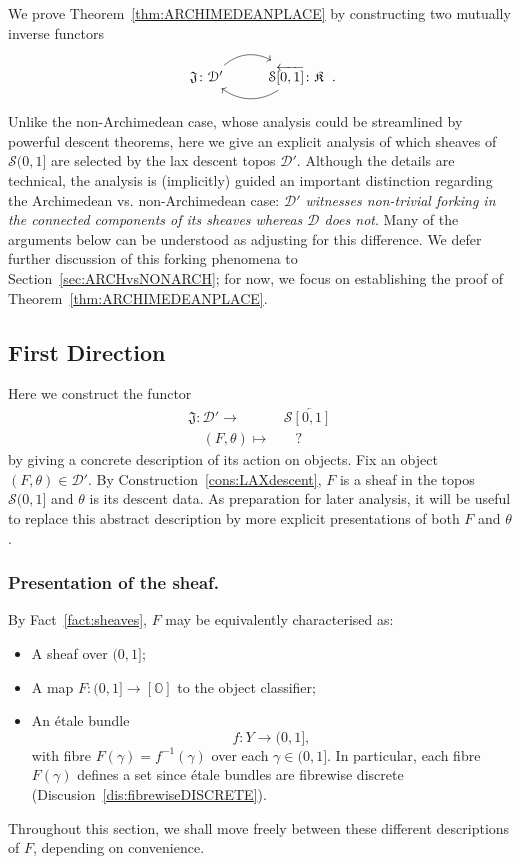 \documentclass[a4paper, 11pt,reqno]{amsart}
\newcommand{\baseS}{\mathcal{S}}
\newcommand{\D}{\mathcal{D}}
\newcommand{\J}{\mathfrak{J}}
\newcommand{\K}{\mathfrak{K}}
\begin{document}
We prove Theorem~\ref{thm:ARCHIMEDEANPLACE} by constructing two mutually inverse functors
\begin{equation*}\label{eq:LAXinverseFUNCTORS}
\begin{tikzcd}
\J\colon\D'
\arrow[r, bend left=35] &
\baseS\overleftarrow{\text{$[0,1]$}}\colon\K
\arrow[l, bend left=35]
\end{tikzcd}\,.
\end{equation*}
Unlike the non-Archimedean case, whose analysis could be streamlined by powerful descent theorems, here we give an explicit analysis of which sheaves of $\baseS(0,1]$ are selected by the lax descent topos $\D'$. Although the details are technical, the analysis is (implicitly) guided an important distinction regarding the Archimedean vs. non-Archimedean case: \emph{$\D'$ witnesses non-trivial forking in the connected components of its sheaves whereas $\D$ does not}. Many of the arguments below can be understood as adjusting for this difference. We defer further discussion of this forking phenomena to Section~\ref{sec:ARCHvsNONARCH}; for now, we focus on establishing the proof of Theorem~\ref{thm:ARCHIMEDEANPLACE}.



\subsection{First Direction}\label{subsec:ElephantstDIRECTION} Here we construct the functor
\begin{align}
\J\colon \D' \longrightarrow & \, \baseS\overleftarrow{[0,1]}\\
\quad (F,\theta)  \mapsto & \quad  ? \qquad\nonumber 
\end{align}
by giving a concrete description of its action on objects. Fix an object $(F,\theta)\in\D'$. By Construction~\ref{cons:LAXdescent}, $F$ is a sheaf in the topos $\baseS(0,1]$ and $\theta$ is its descent data. As preparation for later analysis, it will be useful to replace this abstract description by more explicit presentations of both $F$ and $\theta$. 

\subsubsection*{Presentation of the sheaf.} By Fact~\ref{fact:sheaves},  $F$ may be equivalently characterised as:
\begin{itemize}
	\item  A sheaf over $(0,1]$; %
	\item  A map $F\colon(0,1]\rightarrow [\mathbb{O}]$ to the object classifier;
	\item An \'{e}tale bundle $$f\colon Y\rightarrow (0,1],$$
with fibre $F({\gamma})=f^{-1}(\gamma)$ over each $\gamma\in (0,1]$. In particular, each fibre $F(\gamma)$ defines a set since \'{e}tale bundles are fibrewise discrete (Discusion~\ref{dis:fibrewiseDISCRETE}).
\end{itemize}
Throughout this section, we shall move freely between these different descriptions of $F$, depending on convenience.
\end{document}
